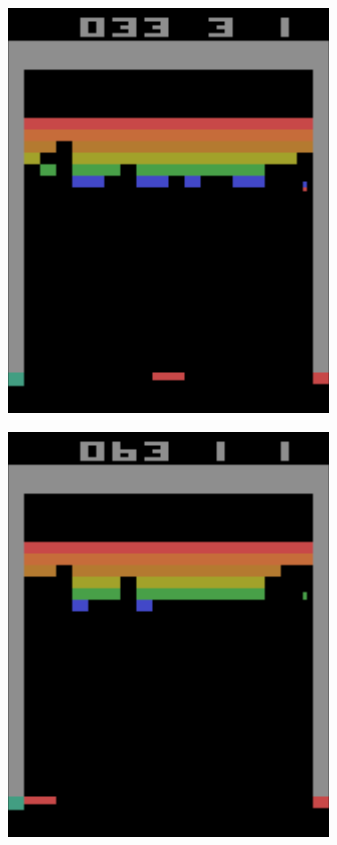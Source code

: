 \begin{figure}
\begin{subfigure}[h]{0.3\linewidth}
\includegraphics[width=\linewidth]{images/atari-sequence-1.png}
\end{subfigure}
\hfill
\begin{subfigure}[h]{0.3\linewidth}
\includegraphics[width=\linewidth]{images/atari-sequence-2.png}

\end{subfigure}
\end{figure}
